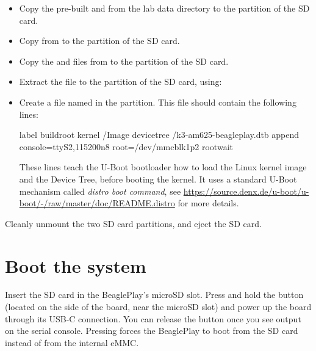 \begin{itemize}

\item Copy the pre-built  and  from
  the lab data directory
   to the
   partition of the SD card.

\item Copy  from  to the
   partition of the SD card.

\item Copy the  and  files
  from  to the  partition of the SD
  card.

\item Extract the  file to the 
  partition of the SD card, using:\\

\item Create a file named  in the
   partition. This file should contain the following lines:

{\small
\begin{fileinput}
label buildroot
  kernel /Image
  devicetree /k3-am625-beagleplay.dtb
  append console=ttyS2,115200n8 root=/dev/mmcblk1p2 rootwait
\end{fileinput}
}

These lines teach the U-Boot bootloader how to load the Linux kernel
image and the Device Tree, before booting the kernel. It uses a
standard U-Boot mechanism called {\em distro boot command}, see
\url{https://source.denx.de/u-boot/u-boot/-/raw/master/doc/README.distro}
for more details.

\end{itemize}

Cleanly unmount the two SD card partitions, and eject the SD card.

\section{Boot the system}

Insert the SD card in the BeaglePlay's microSD slot. Press and hold
the  button (located on the side of the board, near the
microSD slot) and power up the board through its USB-C connection.
You can release the  button once you see output on the
serial console. Pressing  forces the BeaglePlay to boot
from the SD card instead of from the internal eMMC.

